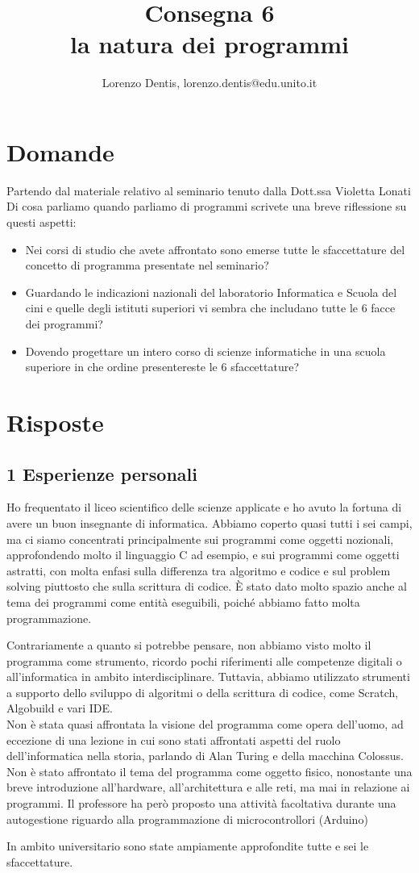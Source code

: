 \documentclass[a4paper]{article}
\begin{document}
\author{Lorenzo Dentis, lorenzo.dentis@edu.unito.it}
\title{Consegna 6 \\ \large la natura dei programmi}
\maketitle

\section{Domande}
Partendo dal materiale relativo al seminario tenuto dalla Dott.ssa Violetta Lonati Di cosa parliamo quando parliamo di programmi scrivete una breve riflessione su questi aspetti:
\begin{itemize}
	\item Nei corsi di studio che avete affrontato sono emerse tutte le sfaccettature del concetto di programma presentate nel seminario?
	\item Guardando le indicazioni nazionali del laboratorio Informatica e Scuola del cini e quelle degli istituti superiori vi sembra che includano tutte le 6 facce dei programmi?
	\item Dovendo progettare un intero corso di scienze informatiche in una scuola superiore in che ordine presentereste le 6 sfaccettature?
\end{itemize}
\section{Risposte}
\subsection{1 Esperienze personali}
Ho frequentato il liceo scientifico delle scienze applicate e ho avuto la fortuna di avere un buon insegnante di informatica. 
Abbiamo coperto quasi tutti i sei campi, ma ci siamo concentrati principalmente sui programmi come oggetti nozionali, approfondendo molto il linguaggio C ad esempio, e sui programmi come oggetti astratti, con molta enfasi sulla differenza tra algoritmo e codice e sul problem solving piuttosto che sulla scrittura di codice.
È stato dato molto spazio anche al tema dei programmi come entità eseguibili, poiché abbiamo fatto molta programmazione.


Contrariamente a quanto si potrebbe pensare, non abbiamo visto molto il programma come strumento, ricordo pochi riferimenti alle competenze digitali o all'informatica in ambito interdisciplinare. Tuttavia, abbiamo utilizzato strumenti a supporto dello sviluppo di algoritmi o della scrittura di codice, come Scratch, Algobuild e vari IDE.\\
Non è stata quasi affrontata la visione del programma come opera dell'uomo, ad eccezione di una lezione in cui sono stati affrontati aspetti del ruolo dell'informatica nella storia, parlando di Alan Turing e della macchina Colossus. 
Non è stato affrontato il tema del programma come oggetto fisico, nonostante una breve introduzione all'hardware, all'architettura e alle reti, ma mai in relazione ai programmi.
Il professore ha però proposto una attività facoltativa durante una autogestione riguardo alla programmazione di microcontrollori (Arduino)


In ambito universitario sono state ampiamente approfondite tutte e sei le sfaccettature.
\end{document}
